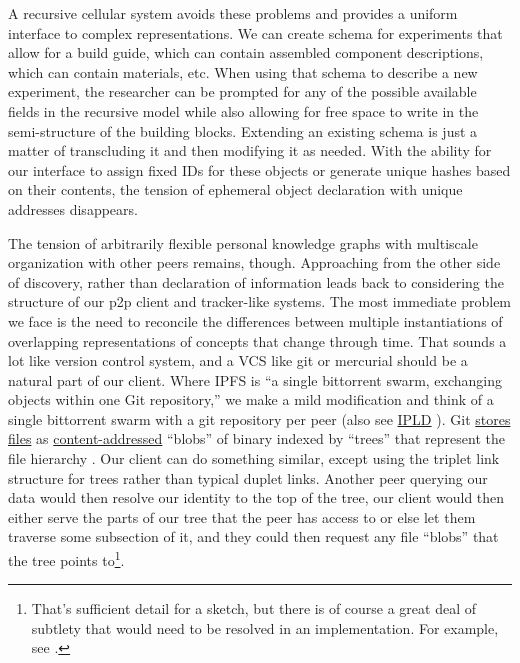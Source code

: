 A recursive cellular system avoids these problems and provides a uniform
interface to complex representations. We can create schema for
experiments that allow for a build guide, which can contain assembled
component descriptions, which can contain materials, etc. When using
that schema to describe a new experiment, the researcher can be prompted
for any of the possible available fields in the recursive model while
also allowing for free space to write in the semi-structure of the
building blocks. Extending an existing schema is just a matter of
transcluding it and then modifying it as needed. With the ability for
our interface to assign fixed IDs for these objects or generate unique
hashes based on their contents, the tension of ephemeral object
declaration with unique addresses disappears.

The tension of arbitrarily flexible personal knowledge graphs with
multiscale organization with other peers remains, though. Approaching
from the other side of discovery, rather than declaration of information
leads back to considering the structure of our p2p client and
tracker-like systems. The most immediate problem we face is the need to
reconcile the differences between multiple instantiations of overlapping
representations of concepts that change through time. That sounds a lot
like version control system, and a VCS like git or mercurial should be a
natural part of our client. Where IPFS is ``a single bittorrent swarm,
exchanging objects within one Git repository,'' \citep{benetIPFSContentAddressed2014}  we make a mild modification and think
of a single bittorrent swarm with a git repository per peer (also see
\href{https://ipld.io/docs/}{IPLD} \citep{protocollabsIPLDDocs2021} ). Git
\href{https://git-scm.com/book/en/v2/Git-Internals-Git-Objects}{stores
files} as
\href{https://en.wikipedia.org/wiki/Content-addressable_storage}{content-addressed}
``blobs'' of binary indexed by ``trees'' that represent the file
hierarchy \citep{chaconProGit2020} . Our client can do something
similar, except using the triplet link structure for trees rather than
typical duplet links. Another peer querying our data would then resolve
our identity to the top of the tree, our client would then either serve
the parts of our tree that the peer has access to or else let them
traverse some subsection of it, and they could then request any file
``blobs'' that the tree points to\footnote{That's sufficient detail for
  a sketch, but there is of course a great deal of subtlety that would
  need to be resolved in an implementation. For example, see \citep{aleksandersenFourP2PDistribution2020, hartgerinkVerifiedSharedModular2019} .}.

